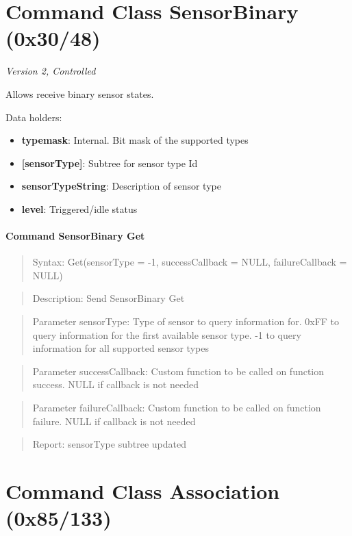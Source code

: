\section{Command Class SensorBinary (0x30/48)}

\textit{Version 2, Controlled}
\newline

Allows receive binary sensor states.
\newline

\noindent
Data holders:

\begin{itemize}
\item \textbf{typemask}: Internal. Bit mask of the supported types
\item \textbf{[sensorType]}: Subtree for sensor type Id
\item \qquad\textbf{sensorTypeString}: Description of sensor type
\item \qquad\textbf{level}: Triggered/idle status
\end{itemize}

\paragraph{Command SensorBinary Get}
\begin{quote}Syntax: Get(sensorType = -1, successCallback = NULL, failureCallback = NULL)\end{quote}
\begin{quote}Description: Send SensorBinary Get\end{quote}
\begin{quote}Parameter sensorType: Type of sensor to query information for. 0xFF to query information for the first available sensor type. -1 to query information for all supported sensor types\end{quote}
\begin{quote}Parameter successCallback: Custom function to be called on function success. NULL if callback is not needed\end{quote}
\begin{quote}Parameter failureCallback: Custom function to be called on function failure. NULL if callback is not needed\end{quote}
\begin{quote}Report: sensorType subtree updated\end{quote}


\section{Command Class Association (0x85/133)}

